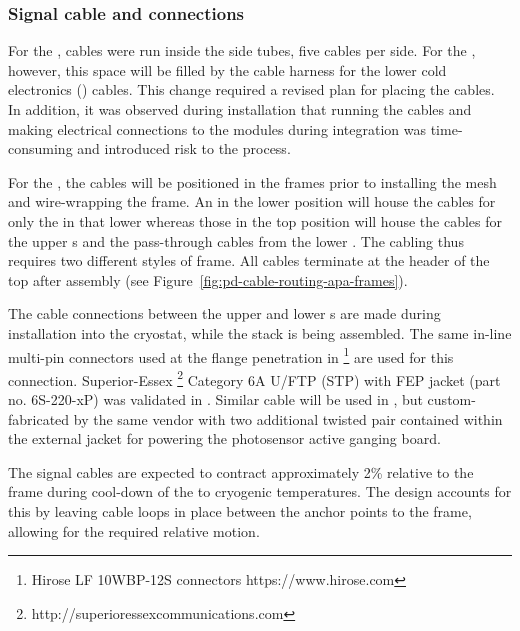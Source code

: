 \subsubsection{Signal cable and connections}

For the ,  cables were run inside the  side tubes, five cables per side.  For the , however, this space will be filled by the cable harness for the lower  cold electronics () cables.  This change required a revised plan for placing the  cables.  In addition, it was observed during   installation that running the  cables and making electrical connections to the modules during  integration was time-consuming and introduced risk to the process.

For the , the  cables will be %
positioned in the  frames prior to installing the %
mesh and wire-wrapping the frame.  
An  in the lower position will house the cables for only the  in that lower  whereas those in the top position will house the cables for the upper  s and the pass-through cables from the lower . The cabling thus requires two different styles of  frame. All cables terminate at the header of the top  after assembly (see Figure~\ref{fig:pd-cable-routing-apa-frames}).


The cable connections between the upper and lower s are made during  installation into the cryostat, while the  stack is being assembled. The same in-line multi-pin connectors used at the flange penetration in \footnote{Hirose LF 10WBP-12S connectors https://www.hirose.com} are used for this connection.  Superior-Essex \footnote{http://superioressexcommunications.com} Category 6A U/FTP (STP) with FEP jacket (part no. 6S-220-xP) was validated in .  Similar cable will be used in , but custom-fabricated by the same vendor with two additional twisted pair contained within the external jacket for powering the photosensor active ganging board.

The  signal cables are expected to contract approximately 2\% relative to the  frame during cool-down of the  to cryogenic temperatures.  The design accounts for this by leaving cable loops in place between the anchor points to the  frame, allowing for the required relative motion.

